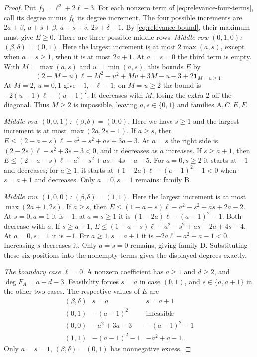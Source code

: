 \documentclass[a4paper,11pt]{amsart}
\numberwithin{equation}{subsection}
\theoremstyle{plain}
\theoremstyle{definition}
\theoremstyle{remark}
\begin{document}
\begin{proof}
Put $f_0=\ell^2+2\ell-3$. For each nonzero term of
\autoref{eq:relevance-four-terms}, call its degree minus $f_0$
its degree increment. The four possible increments are
$2a+\beta$, $a+s+\beta$, $a+s+\delta$,
$2s+\delta-1$.
By \autoref{eq:relevance-bound}, their maximum must give $E\ge0$.
There are three possible middle rows.
\textit{Middle row $(0,1,0)$: $(\beta,\delta)=(0,1)$.} Here the largest increment is at most
$2\max(a,s)$, except when $a=s\ge1$, when it is at most $2a+1$.
At $a=s=0$ the third term is empty.  With $M=\max(a,s)$ and
$u=\min(a,s)$, this bounds $E$ by
\[
(2-M-u)\ell-M^2-u^2+Mu+3M-u-3
+2\mathbf1_{M=u\ge1}.
\]
At $M=2$, $u=0,1$ give $-1,-\ell-1$; on $M=u\ge2$ the bound
is $-2(u-1)\ell-(u-1)^2$. It decreases with $M$, losing the extra
$2$ off the diagonal. Thus $M\ge2$ is impossible, leaving
$a,s\in\{0,1\}$ and families $\mathrm A,C,E,F$.

\textit{Middle row $(0,0,1)$: $(\beta,\delta)=(0,0)$.} Here we have $s\ge1$ and the largest
increment is at most $\max(2a,2s-1)$.  If $a\ge s$, then
$E\le(2-a-s)\ell-a^2-s^2+as+3a-3$.
At $a=s$ the right side is $(2-2s)\ell-s^2+3s-3<0$, and it decreases
as $a$ increases.  If $s\ge a+1$, then
$E\le(2-a-s)\ell-a^2-s^2+as+4s-a-5$.
For $a=0,s\ge2$ it starts at $-1$ and decreases; for $a\ge1$,
it starts at $(1-2a)\ell-(a-1)^2-1<0$ when $s=a+1$ and decreases.
Only $a=0,s=1$ remains: family $\mathrm B$.

\textit{Middle row $(1,0,0)$: $(\beta,\delta)=(1,1)$.} Here the largest increment is at most
$\max(2a+1,2s)$.  If $a\ge s$, then
$E\le(1-a-s)\ell-a^2-s^2+as+2a-2$.
At $s=0,a=1$ it is $-1$; at $a=s\ge1$ it is
$(1-2a)\ell-(a-1)^2-1$. Both decrease with $a$. If $s\ge a+1$,
$E\le(1-a-s)\ell-a^2-s^2+as-2a+4s-4$.
At $a=0,s=1$ it is $-1$.  For $a\ge1,s=a+1$ it is
$-2a\ell-a^2+a-1<0$.  Increasing $s$ decreases it.  Only $a=s=0$
remains, giving family $\mathrm D$.  Substituting these six positions
into the nonempty terms gives the displayed degrees exactly.

\textit{The boundary case $\ell=0$.} A nonzero coefficient has $a\ge1$ and $d\ge2$, and
$\deg F_A=a+d-3$.  Feasibility forces $s=a$ in case $(0,1)$,
and $s\in\{a,a+1\}$ in the other two cases.  The respective values
of $E$ are
\[
\begin{array}{c|cc}
(\beta,\delta)&s=a&s=a+1\\\hline
(0,1)&-(a-1)^2&\text{infeasible}\\
(0,0)&-a^2+3a-3&-(a-1)^2-1\\
(1,1)&-(a-1)^2-1&-a^2+a-1.
\end{array}
\]
Only $a=s=1$, $(\beta,\delta)=(0,1)$ has nonnegative excess.


\end{proof}
\end{document}
